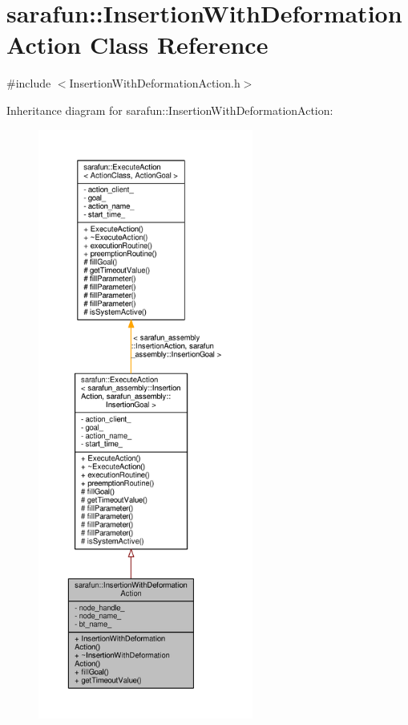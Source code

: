 \hypertarget{classsarafun_1_1InsertionWithDeformationAction}{\section{sarafun\-:\-:Insertion\-With\-Deformation\-Action Class Reference}
\label{classsarafun_1_1InsertionWithDeformationAction}
}


{\ttfamily \#include $<$Insertion\-With\-Deformation\-Action.\-h$>$}



Inheritance diagram for sarafun\-:\-:Insertion\-With\-Deformation\-Action\-:
\nopagebreak
\begin{figure}[H]
\begin{center}
\leavevmode
\includegraphics[height=550pt]{de/dd8/classsarafun_1_1InsertionWithDeformationAction__inherit__graph}
\end{center}
\end{figure}


